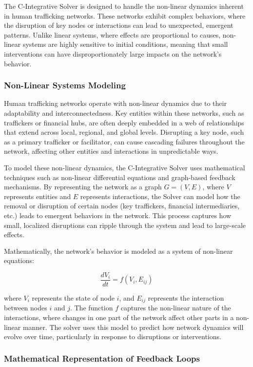 \documentclass[%
 preprint, linenumbers,
 amsmath,amssymb,
 aps, physrev,
]{revtex4-2}
\begin{document}
The C-Integrative Solver is designed to handle the non-linear dynamics inherent in human trafficking networks. These networks exhibit complex behaviors, where the disruption of key nodes or interactions can lead to unexpected, emergent patterns. Unlike linear systems, where effects are proportional to causes, non-linear systems are highly sensitive to initial conditions, meaning that small interventions can have disproportionately large impacts on the network's behavior.

\subsubsection{Non-Linear Systems Modeling}

Human trafficking networks operate with non-linear dynamics due to their adaptability and interconnectedness. Key entities within these networks, such as traffickers or financial hubs, are often deeply embedded in a web of relationships that extend across local, regional, and global levels. Disrupting a key node, such as a primary trafficker or facilitator, can cause cascading failures throughout the network, affecting other entities and interactions in unpredictable ways.

To model these non-linear dynamics, the C-Integrative Solver uses mathematical techniques such as non-linear differential equations and graph-based feedback mechanisms. By representing the network as a graph \( G = (V, E) \), where \( V \) represents entities and \( E \) represents interactions, the Solver can model how the removal or disruption of certain nodes (key traffickers, financial intermediaries, etc.) leads to emergent behaviors in the network. This process captures how small, localized disruptions can ripple through the system and lead to large-scale effects.

Mathematically, the network's behavior is modeled as a system of non-linear equations:

\[
\frac{dV_i}{dt} = f(V_i, E_{ij})
\]

where \( V_i \) represents the state of node \( i \), and \( E_{ij} \) represents the interaction between nodes \( i \) and \( j \). The function \( f \) captures the non-linear nature of the interactions, where changes in one part of the network affect other parts in a non-linear manner. The solver uses this model to predict how network dynamics will evolve over time, particularly in response to disruptions or interventions.

\subsubsection{Mathematical Representation of Feedback Loops}
\end{document}
